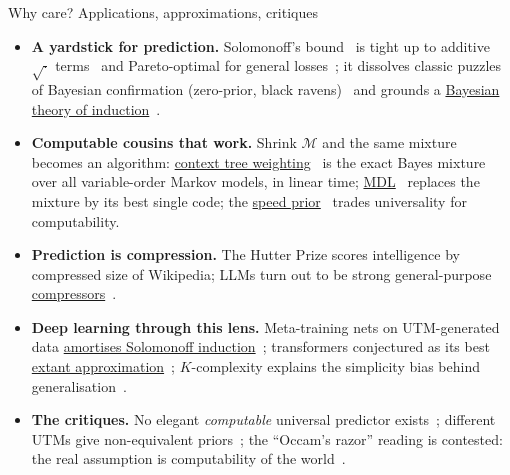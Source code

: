 \documentclass[10pt]{beamer}
\newcommand{\cM}{\mathcal{M}}
\begin{document}
\begin{frame}{Why care? Applications, approximations, critiques}
\small
\begin{itemize}
    \item \textbf{A yardstick for prediction.} Solomonoff's bound~ is tight up to additive
    $\sqrt{\cdot}$ terms~ and Pareto-optimal for general losses~;
    it dissolves classic puzzles of Bayesian confirmation (zero-prior, black ravens)~
    and grounds a \href{https://arxiv.org/abs/1105.5721}{Bayesian theory of induction}~.
    \item \textbf{Computable cousins that work.} Shrink $\cM$ and the same mixture becomes an algorithm:
    \href{https://doi.org/10.1109/18.382012}{context tree weighting}~ is the exact Bayes mixture over all
    variable-order Markov models, in linear time; \href{https://direct.mit.edu/books/monograph/3813}{MDL}~
    replaces the mixture by its best single code; the
    \href{https://link.springer.com/chapter/10.1007/3-540-45435-7_15}{speed prior}~ trades universality for computability.
    \item \textbf{Prediction is compression.} The Hutter Prize scores intelligence by compressed size of Wikipedia; LLMs
    turn out to be strong general-purpose \href{https://arxiv.org/abs/2309.10668}{compressors}~.
    \item \textbf{Deep learning through this lens.} Meta-training nets on UTM-generated data
    \href{https://arxiv.org/abs/2401.14953}{amortises Solomonoff induction}~; transformers
    conjectured as its best \href{https://arxiv.org/abs/2408.12065}{extant approximation}~;
    $K$-complexity explains the simplicity bias behind generalisation~.
    \item \textbf{The critiques.} No elegant \emph{computable} universal predictor exists~;
    different UTMs give non-equivalent priors~; the ``Occam's razor'' reading is contested:
    the real assumption is computability of the world~.
\end{itemize}
\end{frame}

\end{document}
